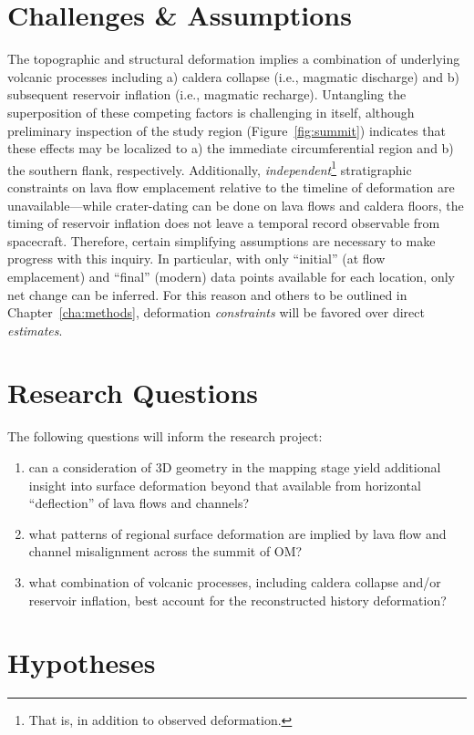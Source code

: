 \section{Challenges \& Assumptions}
The topographic and structural deformation implies a combination of underlying volcanic processes including a) caldera collapse (i.e., magmatic discharge) and b) subsequent reservoir inflation (i.e., magmatic recharge). Untangling the superposition of these competing factors is challenging in itself, although preliminary inspection of the study region (Figure~\ref{fig:summit}) indicates that these effects may be localized to a) the immediate circumferential region and b) the southern flank, respectively. Additionally, \textit{independent}\footnote{That is, in addition to observed deformation.} stratigraphic constraints on lava flow emplacement relative to the timeline of deformation are unavailable---while crater-dating can be done on lava flows and caldera floors, the timing of reservoir inflation does not leave a temporal record observable from spacecraft. Therefore, certain simplifying assumptions are necessary to make progress with this inquiry. In particular, with only ``initial'' (at flow emplacement) and ``final'' (modern) data points available for each location, only net change can be inferred. For this reason and others to be outlined in Chapter~\ref{cha:methods}, deformation \textit{constraints} will be favored over direct \textit{estimates}.

\section{Research Questions}

The following questions will inform the research project: \begin{enumerate}
    \item can a consideration of 3D geometry in the mapping stage yield additional insight into surface deformation beyond that available from horizontal ``deflection'' of lava flows and channels?
    \item what patterns of regional surface deformation are implied by lava flow and channel misalignment across the summit of \ac{OM}?
    \item what combination of volcanic processes, including caldera collapse and/or reservoir inflation, best account for the reconstructed history deformation?
\end{enumerate}

\section{Hypotheses}

